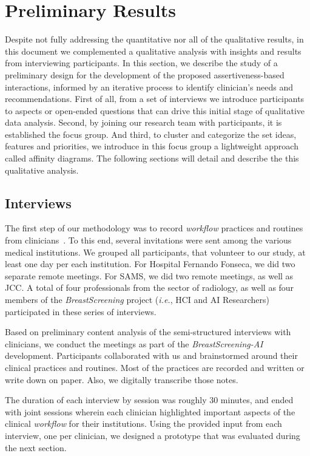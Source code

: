 \section{Preliminary Results}
\label{sec:sec005}

Despite not fully addressing the quantitative nor all of the qualitative results, in this document we complemented a qualitative analysis with insights and results from interviewing participants.
In this section, we describe the study of a preliminary design for the development of the proposed assertiveness-based interactions, informed by an iterative process to identify clinician's needs and recommendations.
First of all, from a set of interviews we introduce participants to aspects or open-ended questions that can drive this initial stage of qualitative data analysis.
Second, by joining our research team with participants, it is established the focus group.
And third, to cluster and categorize the set ideas, features and priorities, we introduce in this focus group a lightweight approach called affinity diagrams.
The following sections will detail and describe the this qualitative analysis.

\subsection{Interviews}
\label{sec:sec00501}

The first step of our methodology was to record {\it workflow} practices and routines from clinicians~\cite{Hoiseth:2013:RGD:2468356.2468436}.
To this end, several invitations were sent among the various medical institutions.
We grouped all participants, that volunteer to our study, at least one day per each institution.
For Hospital Fernando Fonseca, we did two separate remote meetings.
For SAMS, we did two remote meetings, as well as JCC.
A total of four professionals from the sector of radiology, as well as four members of the {\it BreastScreening} project ({\it i.e.}, HCI and AI Researchers) participated in these series of interviews.

Based on preliminary content analysis of the semi-structured interviews with clinicians, we conduct the meetings as part of the {\it BreastScreening-AI} development.
Participants collaborated with us and brainstormed around their clinical practices and routines.
Most of the practices are recorded and written or write down on paper.
Also, we digitally transcribe those notes.

The duration of each interview by session was roughly 30 minutes, and ended with joint sessions wherein each clinician highlighted important aspects of the clinical {\it workflow} for their institutions.
Using the provided input from each interview, one per clinician, we designed a prototype that was evaluated during the next section.

